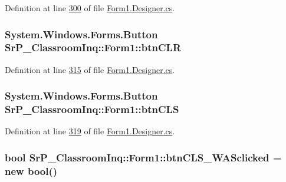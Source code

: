 \-Definition at line \hyperlink{_form1_8_designer_8cs_source_l00300}{300} of file \hyperlink{_form1_8_designer_8cs_source}{\-Form1.\-Designer.\-cs}.

\hypertarget{class_sr_p___classroom_inq_1_1_form1_a43f801ebb9c0a215764953588fa9c4f1}{
\subsubsection[{btn\-C\-L\-R}]{\setlength{\rightskip}{0pt plus 5cm}\-System.\-Windows.\-Forms.\-Button {\bf \-Sr\-P\-\_\-\-Classroom\-Inq\-::\-Form1\-::btn\-C\-L\-R}}}
\label{class_sr_p___classroom_inq_1_1_form1_a43f801ebb9c0a215764953588fa9c4f1}


\-Definition at line \hyperlink{_form1_8_designer_8cs_source_l00315}{315} of file \hyperlink{_form1_8_designer_8cs_source}{\-Form1.\-Designer.\-cs}.

\hypertarget{class_sr_p___classroom_inq_1_1_form1_a500406f80ad03c1b3fdf9d7cfc75c7f3}{
\subsubsection[{btn\-C\-L\-S}]{\setlength{\rightskip}{0pt plus 5cm}\-System.\-Windows.\-Forms.\-Button {\bf \-Sr\-P\-\_\-\-Classroom\-Inq\-::\-Form1\-::btn\-C\-L\-S}}}
\label{class_sr_p___classroom_inq_1_1_form1_a500406f80ad03c1b3fdf9d7cfc75c7f3}


\-Definition at line \hyperlink{_form1_8_designer_8cs_source_l00319}{319} of file \hyperlink{_form1_8_designer_8cs_source}{\-Form1.\-Designer.\-cs}.

\hypertarget{class_sr_p___classroom_inq_1_1_form1_a262b78a24b801b386d3a5684a3145406}{
\subsubsection[{btn\-C\-L\-S\-\_\-\-W\-A\-Sclicked}]{\setlength{\rightskip}{0pt plus 5cm}bool {\bf \-Sr\-P\-\_\-\-Classroom\-Inq\-::\-Form1\-::btn\-C\-L\-S\-\_\-\-W\-A\-Sclicked} = new bool()}}
\label{class_sr_p___classroom_inq_1_1_form1_a262b78a24b801b386d3a5684a3145406}


